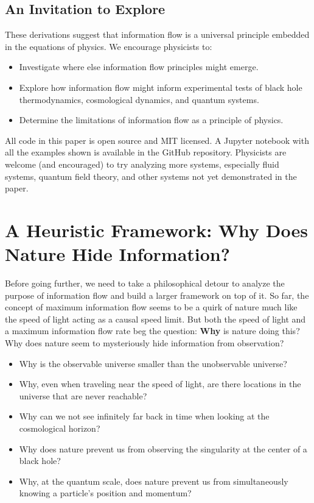 \documentclass[12pt]{article}
\begin{document}
\subsection{An Invitation to Explore}

These derivations suggest that information flow is a universal principle embedded in the equations of physics. We encourage physicists to:
\begin{itemize}
    \item Investigate where else information flow principles might emerge.
    \item Explore how information flow might inform experimental tests of black hole thermodynamics, cosmological dynamics, and quantum systems.
    \item Determine the limitations of information flow as a principle of physics.
\end{itemize}

All code in this paper is open source and MIT licensed. A Jupyter notebook with all the examples shown is available in the GitHub repository. Physicists are welcome (and encouraged) to try analyzing more systems, especially fluid systems, quantum field theory, and other systems not yet demonstrated in the paper.


\section{A Heuristic Framework: Why Does Nature Hide Information?}

Before going further, we need to take a philosophical detour to analyze the purpose of information flow and build a larger framework on top of it. So far, the concept of maximum information flow seems to be a quirk of nature much like the speed of light acting as a causal speed limit. But both the speed of light and a maximum information flow rate beg the question: \textbf{Why} is nature doing this? Why does nature seem to mysteriously hide information from observation?
\begin{itemize}
    \item Why is the observable universe smaller than the unobservable universe?
    \item Why, even when traveling near the speed of light, are there locations in the universe that are never reachable?
    \item Why can we not see infinitely far back in time when looking at the cosmological horizon?
    \item Why does nature prevent us from observing the singularity at the center of a black hole?
    \item Why, at the quantum scale, does nature prevent us from simultaneously knowing a particle's position and momentum?
\end{itemize}
\end{document}
